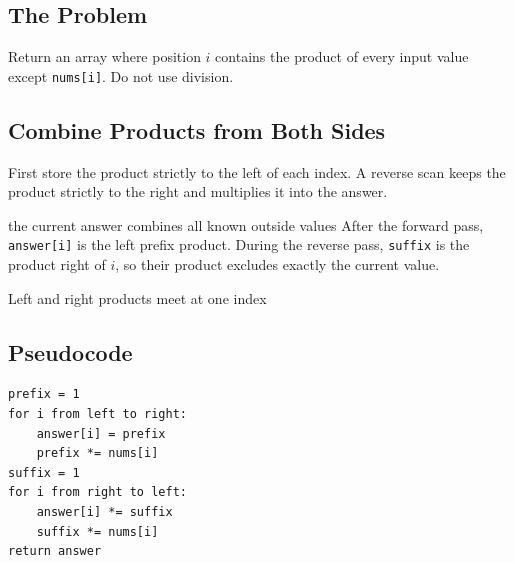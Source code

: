 

\subsection{The Problem}
Return an array where position \(i\) contains the product of every input value
except \texttt{nums[i]}. Do not use division.

\subsection{Combine Products from Both Sides}
First store the product strictly to the left of each index. A reverse scan
keeps the product strictly to the right and multiplies it into the answer.

\begin{invariantbox}{the current answer combines all known outside values}
After the forward pass, \texttt{answer[i]} is the left prefix product. During
the reverse pass, \texttt{suffix} is the product right of \(i\), so their
product excludes exactly the current value.
\end{invariantbox}

\begin{visualbox}{Left and right products meet at one index}
\centering
{}
\end{visualbox}

\subsection{Pseudocode}
\begin{lstlisting}[style=pseudocode]
prefix = 1
for i from left to right:
    answer[i] = prefix
    prefix *= nums[i]
suffix = 1
for i from right to left:
    answer[i] *= suffix
    suffix *= nums[i]
return answer
\end{lstlisting}

